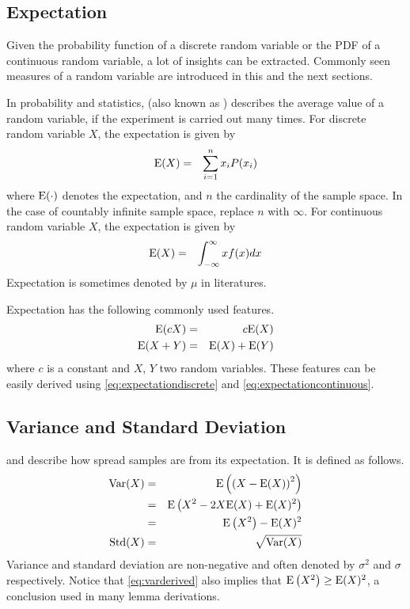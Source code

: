 \subsection{Expectation}

Given the probability function of a discrete random variable or the PDF of a continuous random variable, a lot of insights can be extracted. Commonly seen measures of a random variable are introduced in this and the next sections.

In probability and statistics,  (also known as ) describes the average value of a random variable, if the experiment is carried out many times. For discrete random variable $X$, the expectation is given by
\begin{eqnarray}
	\textup{E}(X) &=& \sum_{i=1}^{n}x_iP(x_i) \label{eq:expectationdiscrete}
\end{eqnarray}
where $\textup{E}(\cdot)$ denotes the expectation, and $n$ the cardinality of the sample space. In the case of countably infinite sample space, replace $n$ with $\infty$. For continuous random variable $X$, the expectation is given by
\begin{eqnarray}
	\textup{E}(X) &=& \int_{-\infty}^{\infty}xf(x)dx \label{eq:expectationcontinuous}
\end{eqnarray}
Expectation is sometimes denoted by $\mu$ in literatures.

Expectation has the following commonly used features.
\begin{eqnarray}
	\textup{E}(cX) &=& c\textup{E}(X) \nonumber \\
	\textup{E}(X+Y) &=& \textup{E}(X) + \textup{E}(Y) \nonumber
\end{eqnarray}
where $c$ is a constant and $X$, $Y$ two random variables. These features can be easily derived using \eqref{eq:expectationdiscrete} and \eqref{eq:expectationcontinuous}. 

\subsection{Variance and Standard Deviation}

 and  describe how spread samples are from its expectation. It is defined as follows.
\begin{eqnarray}
	\textup{Var}(X) &=& \textup{E}\left(\left(X-\textup{E}(X)\right)^2\right) \label{eq:vardef} \\
	&=& \textup{E}\left(X^2-2X\textup{E}(X)+\textup{E}(X)^2\right) \nonumber \\
	&=& \textup{E}\left(X^2\right)-\textup{E}(X)^2 \label{eq:varderived} \\
	\textup{Std}(X) &=& \sqrt{\textup{Var}(X)} \nonumber
\end{eqnarray}
Variance and standard deviation are non-negative and often denoted by $\sigma^2$ and $\sigma$ respectively. Notice that \eqref{eq:varderived} also implies that $\textup{E}\left(X^2\right) \geq \textup{E}(X)^2$, a conclusion used in many lemma derivations.

